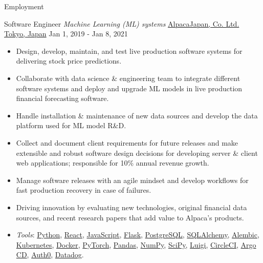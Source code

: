 \documentclass[]{mcdowellcv}
\begin{document}
\begin{cvsection}{Employment}
    \begin{cvsubsection}
      {Software Engineer \linebreak \textit{Machine Learning (ML) systems}}
      {\href{https://www.alpaca.markets/jp/about.html}{AlpacaJapan, Co. Ltd. \linebreak Tokyo, Japan}}
      {Jan 1, 2019 - Jan 8, 2021}
        \begin{itemize}
          \item
            Design, develop, maintain, and test live production software
            systems for delivering stock price predictions.
          \item
            Collaborate with data science \& engineering team to integrate
            different software systems and deploy and upgrade ML models in
            live production financial forecasting software.
          \item
            Handle installation \& maintenance of new data sources and
            develop the data platform used for ML model R\&D.
          \item
            Collect and document client requirements for future releases and
            make extensible and robust software design decisions for
            developing server \& client web applications; responsible for
            10\% annual revenue growth.
          \item
            Manage software releases with an agile mindset and develop
            workflows for fast production recovery in case of failures.
          \item
            Driving innovation by evaluating new technologies, original
            financial data sources, and recent research papers that add value
            to Alpaca's products.
          \item
            \textit{Tools}: \href{https://www.python.org/}{Python},
            \href{https://react.dev/}{React},
            \href{https://developer.mozilla.org/en-US/docs/Web/JavaScript}{JavaScript},
            \href{https://flask.palletsprojects.com/}{Flask},
            \href{https://www.postgresql.org/}{PostgreSQL},
            \href{https://www.sqlalchemy.org/}{SQLAlchemy},
            \href{https://alembic.sqlalchemy.org/en/latest/}{Alembic},
            \href{https://kubernetes.io/}{Kubernetes},
            \href{https://www.docker.com/}{Docker},
            \href{https://pytorch.org/}{PyTorch},
            \href{https://pandas.pydata.org/}{Pandas},
            \href{https://numpy.org/}{NumPy}, \href{https://scipy.org/}{SciPy},
            \href{https://github.com/spotify/luigi}{Luigi},
            \href{https://circleci.com/}{CircleCI},
            \href{https://argoproj.github.io/cd/}{Argo CD},
            \href{https://auth0.com/}{Auth0},
            \href{https://www.datadoghq.com/}{Datadog}.
        \end{itemize}
    \end{cvsubsection}


\end{cvsection}
\end{document}
